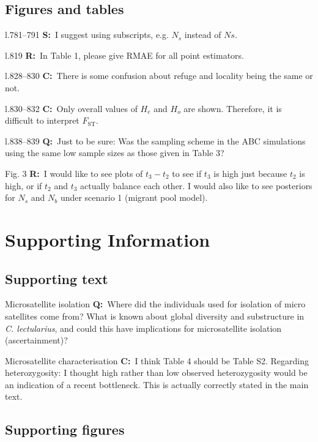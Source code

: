 \documentclass[11pt]{article}
\newenvironment{my_description}
{\begin{description}
  \setlength{\itemsep}{2pt}
  \setlength{\parskip}{0pt}
  \setlength{\parsep}{0pt}}
{\end{description}}
\newcommand{\C}{\textbf{C:}\ }
\newcommand{\Q}{\textbf{Q:}\ }
\newcommand{\R}{\textbf{R:}\ }
\newcommand{\V}{\textbf{S:}\ }
\begin{document}
\subsection{Figures and tables}
\begin{my_description}
	\item[l.781--791] \V I suggest using subscripts, e.g. $N_s$ instead of $Ns$.
	\item[l.819] \R In Table 1, please give RMAE for all point estimators.
	\item[l.828--830] \C There is some confusion about refuge and locality being the same or not.
	\item[l.830--832] \C Only overall values of $H_e$ and $H_o$ are shown. Therefore, it is difficult to interpret $F_{\mathrm{ST}}$.
	\item[l.838--839] \Q Just to be sure: Was the sampling scheme in the ABC simulations using the same low sample sizes as those given in Table 3?
	\item[Fig. 3] \R I would like to see plots of $t_3 - t_2$ to see if $t_3$ is high just because $t_2$ is high, or if $t_2$ and $t_3$ actually balance each other. I would also like to see posteriors for $N_s$ and $N_b$ under scenario 1 (migrant pool model).
\end{my_description}


\section{Supporting Information}

\subsection{Supporting text}
\begin{my_description}
	\item[Microsatellite isolation] \Q Where did the individuals used for isolation of micro satellites come from? What is known about global diversity and substructure in \emph{C. lectularius}, and could this have implications for microsatellite isolation (ascertainment)?
	\item[Microsatellite characterisation] \C I think Table 4 should be Table S2. Regarding heterozygosity: I thought high rather than low observed heterozygosity would be an indication of a recent bottleneck. This is actually correctly stated in the main text.
\end{my_description}


\subsection{Supporting figures}
\end{document}
